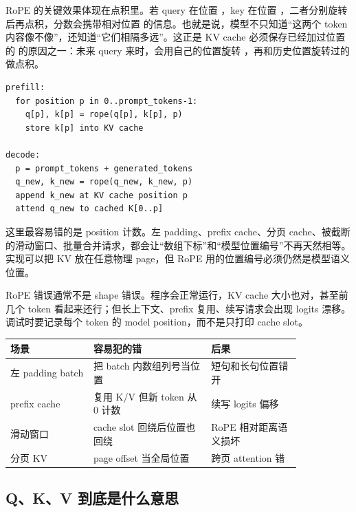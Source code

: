 RoPE 的关键效果体现在点积里。若 query 在位置 ，key 在位置 ，二者分别旋转后再点积，分数会携带相对位置  的信息。也就是说，模型不只知道“这两个 token 内容像不像”，还知道“它们相隔多远”。这正是 KV cache 必须保存已经加过位置的  的原因之一：未来 query 来时，会用自己的位置旋转 ，再和历史位置旋转过的  做点积。

\begin{lstlisting}[numbers=none,caption={RoPE 在 prefill 和 decode 中的位置合同}]
prefill:
  for position p in 0..prompt_tokens-1:
    q[p], k[p] = rope(q[p], k[p], p)
    store k[p] into KV cache

decode:
  p = prompt_tokens + generated_tokens
  q_new, k_new = rope(q_new, k_new, p)
  append k_new at KV cache position p
  attend q_new to cached K[0..p]
\end{lstlisting}

这里最容易错的是 position 计数。左 padding、prefix cache、分页 cache、被截断的滑动窗口、批量合并请求，都会让“数组下标”和“模型位置编号”不再天然相等。实现可以把 KV 放在任意物理 page，但 RoPE 用的位置编号必须仍然是模型语义位置。

\begin{warningbox}
RoPE 错误通常不是 shape 错误。程序会正常运行，KV cache 大小也对，甚至前几个 token 看起来还行；但长上下文、prefix 复用、续写请求会出现 logits 漂移。调试时要记录每个 token 的 model position，而不是只打印 cache slot。
\end{warningbox}

\begin{center}
\begin{tabular}{p{0.24\linewidth}p{0.34\linewidth}p{0.26\linewidth}}
\toprule
场景 & 容易犯的错 & 后果 \\
\midrule
左 padding batch & 把 batch 内数组列号当位置 & 短句和长句位置错开 \\
prefix cache & 复用 K/V 但新 token 从 0 计数 & 续写 logits 偏移 \\
滑动窗口 & cache slot 回绕后位置也回绕 & RoPE 相对距离语义损坏 \\
分页 KV & page offset 当全局位置 & 跨页 attention 错 \\
\bottomrule
\end{tabular}
\end{center}

\subsection{Q、K、V 到底是什么意思}

